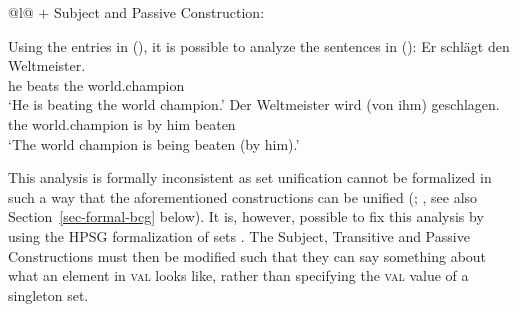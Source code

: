 \begin{tabular}[t]{@{}l@{}}
 $+$ Subject and Passive Construction:\\
\end{tabular}
\zl
Using the entries in (), it is possible to analyze the sentences in ():
\eal
\label{ex-cxg-weltmeister}
\ex 
\gll Er schlägt den Weltmeister.\\
	 he beats the world.champion\\
\glt `He is beating the world champion.'
\ex 
\gll Der Weltmeister wird (von ihm) geschlagen.\\
	 the world.champion is \spacebr{}by him beaten\\
\glt `The world champion is being beaten (by him).'
\zl

\noindent
This analysis is formally inconsistent as set unification cannot be formalized
in such a way that the aforementioned constructions can be unified (\citealp{Mueller2006d};
\citealp[Section~7.5.2]{MuellerLehrbuch1}, see also Section~\ref{sec-formal-bcg} below).
It is, however, possible to fix this analysis by using the HPSG formalization of sets \citep{ps,PM90}.
The Subject, Transitive and Passive Constructions must then be modified such that they can say something about what
an element in \textsc{val} looks like, rather than specifying the \textsc{val} value of a singleton set.

